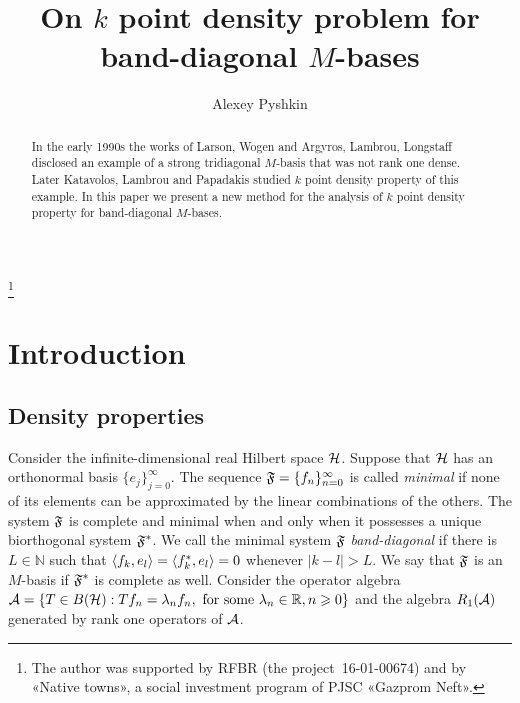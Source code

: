 \documentclass[12pt]{amsart}
\theoremstyle{case}
\begin{document}
\title{On $k$ point density problem for band-diagonal $M$-bases}
\author{Alexey Pyshkin}
\begin{abstract}
  In the early 1990s the works of Larson, Wogen and Argyros, Lambrou, Longstaff
    disclosed an example of a strong tridiagonal $M$-basis that was not rank one dense.
  Later Katavolos, Lambrou and Papadakis studied $k$ point density property of this example.
  In this paper we present a new method for the analysis of $k$ point density property for band-diagonal
    $M$-bases.
\end{abstract}
\thanks{The author was supported by RFBR (the project~16-01-00674) and by «Native towns», a social investment program of PJSC «Gazprom Neft».}
\maketitle

\section{Introduction}
  \subsection{Density properties}
    Consider the infinite-dimensional real Hilbert space $\cal{H}$.
    Suppose that $\cal{H}$ has an orthonormal basis $\{e_j\}_{j=0}^\infty$.
    The sequence $\fsys=\seq{f}$ is called \emph{minimal} if none of its elements can be approximated by the linear combinations of the others.
    The system $\fsys$ is complete and minimal when and only when it possesses a unique biorthogonal system $\fstarsys$.
    We call the minimal system $\fsys$ \emph{band-diagonal} if there is $L \in \mathbb{N}$ such that $\inner{f_k}{e_l} = \inner{f^*_k}{e_l} = 0$
      whenever $\lvert k - l \rvert > L$.
    We say that $\fsys$ is an $M$-basis if $\fstarsys$ is complete as well.
    Consider the operator algebra ${\cal{A} = \{T\in B(\cal{H}): Tf_n = \lambda_n f_n,  \text{ for some } \lambda_n \in \mathbb{R}, n \geq 0\}}$
      and the algebra $R_1(\cal{A})$ generated by rank one operators of $\cal{A}$.
\end{document}
